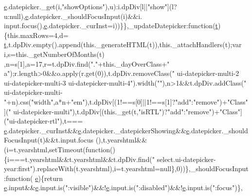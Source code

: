\begin{DoxyCode}
      \hyperlink{jquery-ui_8min_8js_a2c038346d47955cbe2cb91e338edd7e1}{e}.datepicker.\_get(i,\textcolor{stringliteral}{"showOptions"}),u):i.dpDiv[l||\textcolor{stringliteral}{"show"}](l?u:null),\hyperlink{jquery-ui_8min_8js_a2c038346d47955cbe2cb91e338edd7e1}{e}.datepicker.\_shouldFocusInput(i)&&i.
      input.focus(),\hyperlink{jquery-ui_8min_8js_a2c038346d47955cbe2cb91e338edd7e1}{e}.datepicker.\_curInst=i))\}\},\_updateDatepicker:\textcolor{keyword}{function}(\hyperlink{jquery-2_80_83_8min_8js_aaccc9105df5383111407fd5b41255e23}{t})\{this.maxRows=4,d=
      \hyperlink{jquery-2_80_83_8min_8js_aaccc9105df5383111407fd5b41255e23}{t},t.dpDiv.empty().append(this.\_generateHTML(t)),this.\_attachHandlers(t);var i,s=this.\_getNumberOfMonths(t)
      ,n=s[1],a=17,r=t.dpDiv.find(\textcolor{stringliteral}{"."}+this.\_dayOverClass+\textcolor{stringliteral}{" a"});r.length>0&&o.apply(r.get(0)),t.dpDiv.removeClass(\textcolor{stringliteral}{"
      ui-datepicker-multi-2 ui-datepicker-multi-3 ui-datepicker-multi-4"}).width(\textcolor{stringliteral}{""}),n>1&&t.dpDiv.addClass(\textcolor{stringliteral}{"
      ui-datepicker-multi-"}+n).css(\textcolor{stringliteral}{"width"},a*n+\textcolor{stringliteral}{"em"}),t.dpDiv[(1!==s[0]||1!==s[1]?\textcolor{stringliteral}{"add"}:\textcolor{stringliteral}{"remove"})+\textcolor{stringliteral}{"Class"}](\textcolor{stringliteral}{"
      ui-datepicker-multi"}),t.dpDiv[(this.\_get(t,\textcolor{stringliteral}{"isRTL"})?\textcolor{stringliteral}{"add"}:\textcolor{stringliteral}{"remove"})+\textcolor{stringliteral}{"Class"}](\textcolor{stringliteral}{"ui-datepicker-rtl"}),t===
      \hyperlink{jquery-ui_8min_8js_a2c038346d47955cbe2cb91e338edd7e1}{e}.datepicker.\_curInst&&\hyperlink{jquery-ui_8min_8js_a2c038346d47955cbe2cb91e338edd7e1}{e}.datepicker.\_datepickerShowing&&\hyperlink{jquery-ui_8min_8js_a2c038346d47955cbe2cb91e338edd7e1}{e}.datepicker.\_shouldFocusInput(t)&&t.input.focus
      (),t.yearshtml&&(i=t.yearshtml,setTimeout(\textcolor{keyword}{function}()\{i===t.yearshtml&&t.yearshtml&&t.dpDiv.find(\textcolor{stringliteral}{"
      select.ui-datepicker-year:first"}).replaceWith(t.yearshtml),i=t.yearshtml=null\},0))\},\_shouldFocusInput:\textcolor{keyword}{function}(
      \hyperlink{jquery-ui_8min_8js_a2c038346d47955cbe2cb91e338edd7e1}{e})\{\textcolor{keywordflow}{return} \hyperlink{jquery-ui_8min_8js_a2c038346d47955cbe2cb91e338edd7e1}{e}.input&&\hyperlink{jquery-ui_8min_8js_a2c038346d47955cbe2cb91e338edd7e1}{e}.input.is(\textcolor{stringliteral}{":visible"})&&!\hyperlink{jquery-ui_8min_8js_a2c038346d47955cbe2cb91e338edd7e1}{e}.input.is(\textcolor{stringliteral}{":disabled"})&&!\hyperlink{jquery-ui_8min_8js_a2c038346d47955cbe2cb91e338edd7e1}{e}.input.is(\textcolor{stringliteral}{":focus"})\},

\end{DoxyCode}

